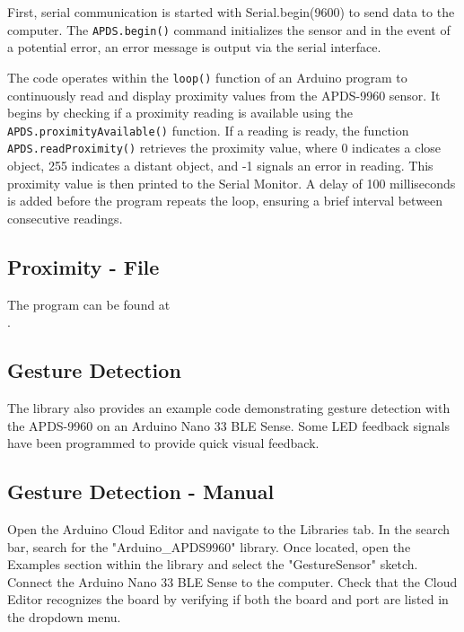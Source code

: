 First, serial communication is started with Serial.begin(9600) to send data to the computer. The \texttt{APDS.begin()} command initializes the sensor and in the event of a potential error, an error message is output via the serial interface.



The code operates within the \texttt{loop()} function of an Arduino program to continuously read and display proximity values from the APDS-9960 sensor. It begins by checking if a proximity reading is available using the \texttt{APDS.proximityAvailable()} function. If a reading is ready, the function \texttt{APDS.readProximity()} retrieves the proximity value, where 0 indicates a close object, 255 indicates a distant object, and -1 signals an error in reading. This proximity value is then printed to the Serial Monitor. A delay of 100 milliseconds is added before the program repeats the loop, ensuring a brief interval between consecutive readings.



\subsection{Proximity - File}

The program can be found at \\
.

\subsection{Gesture Detection}

The library also provides an example code demonstrating gesture detection with the APDS-9960 on an Arduino Nano 33 BLE Sense. Some LED feedback signals have been programmed to provide quick visual feedback.

\subsection{Gesture Detection - Manual}

Open the Arduino Cloud Editor and navigate to the Libraries tab. In the search bar, search for the "Arduino\_APDS9960" library. Once located, open the Examples section within the library and select the "GestureSensor" sketch.
\smallskip
Connect the Arduino Nano 33 BLE Sense to the computer. Check that the Cloud Editor recognizes the board by verifying if both the board and port are listed in the dropdown menu.

